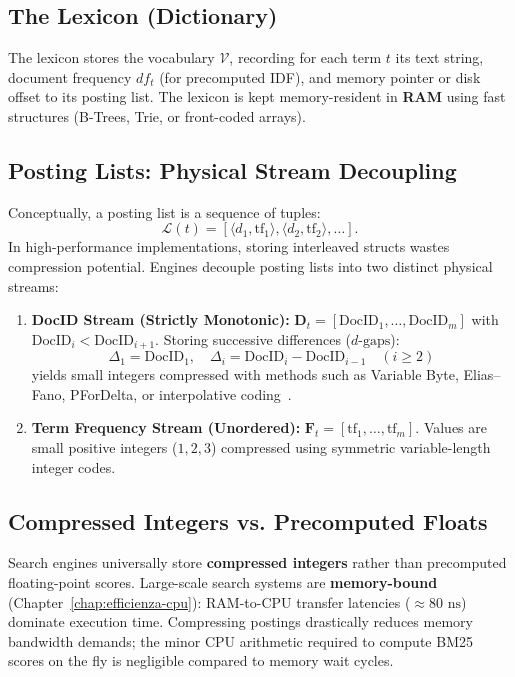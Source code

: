 \subsection{The Lexicon (Dictionary)}
The lexicon stores the vocabulary $\mathcal{V}$, recording for each term $t$ its text string, document frequency $df_t$ (for precomputed IDF), and memory pointer or disk offset to its posting list. The lexicon is kept memory-resident in \textbf{RAM} using fast structures (B-Trees, Trie, or front-coded arrays).

\subsection{Posting Lists: Physical Stream Decoupling}
Conceptually, a posting list is a sequence of tuples:
\begin{equation}
\mathcal{L}(t) = [\langle d_1, \text{tf}_1 \rangle, \langle d_2, \text{tf}_2 \rangle, \dots].
\end{equation}
In high-performance implementations, storing interleaved structs wastes compression potential. Engines decouple posting lists into two distinct physical streams:
\begin{enumerate}
    \item \textbf{DocID Stream (Strictly Monotonic):}
    $\mathbf{D}_t = [\text{DocID}_1, \dots, \text{DocID}_m]$ with $\text{DocID}_i < \text{DocID}_{i+1}$. Storing successive differences ($d\text{-gaps}$):
    \begin{equation}
    \Delta_1 = \text{DocID}_1, \quad \Delta_i = \text{DocID}_i - \text{DocID}_{i-1} \quad (i \ge 2)
    \end{equation}
    yields small integers compressed with methods such as Variable Byte, Elias\allowbreak--Fano, PFor\-Delta, or interpolative coding~\cite{moffat2000}.
    \item \textbf{Term Frequency Stream (Unordered):}
    $\mathbf{F}_t = [\text{tf}_1, \dots, \text{tf}_m]$. Values are small positive integers ($1, 2, 3$) compressed using symmetric variable-length integer codes.
\end{enumerate}

\subsection{Compressed Integers vs. Precomputed Floats}
Search engines universally store \textbf{compressed integers} rather than precomputed floating-point scores. Large-scale search systems are \textbf{memory-bound} (Chapter~\ref{chap:efficienza-cpu}): RAM-to-CPU transfer latencies ($\approx 80\text{ ns}$) dominate execution time. Compressing postings drastically reduces memory bandwidth demands; the minor CPU arithmetic required to compute BM25 scores on the fly is negligible compared to memory wait cycles.


